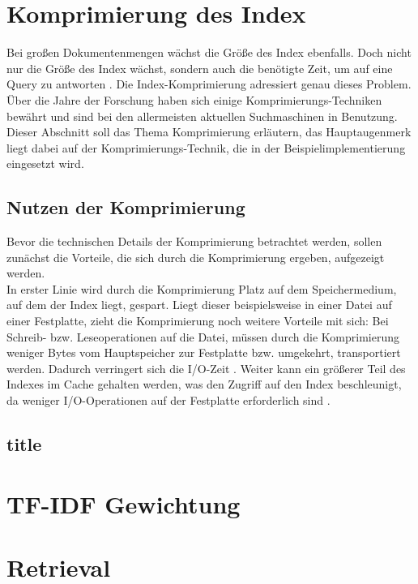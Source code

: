 \section{Komprimierung des Index}
Bei großen Dokumentenmengen wächst die Größe des Index ebenfalls. Doch nicht nur die Größe des Index wächst, sondern auch die benötigte Zeit, um auf eine Query zu antworten \cite{IR_Intro_Cambridge}.
Die Index-Komprimierung adressiert genau dieses Problem. Über die Jahre der Forschung haben sich einige Komprimierungs-Techniken bewährt und sind bei den allermeisten aktuellen Suchmaschinen in Benutzung. \newline
Dieser Abschnitt soll das Thema Komprimierung erläutern, das Hauptaugenmerk liegt dabei auf der Komprimierungs-Technik, die in der Beispielimplementierung eingesetzt wird.

\subsection{Nutzen der Komprimierung}
Bevor die technischen Details der Komprimierung betrachtet werden, sollen zunächst die Vorteile, die sich durch die Komprimierung ergeben, aufgezeigt werden.
\\
In erster Linie wird durch die Komprimierung Platz auf dem Speichermedium, auf dem der Index liegt, gespart. Liegt dieser beispielsweise in einer Datei auf einer Festplatte, zieht die Komprimierung noch weitere Vorteile mit sich: Bei Schreib- bzw. Leseoperationen auf die Datei, müssen durch die Komprimierung weniger Bytes vom Hauptspeicher zur Festplatte bzw. umgekehrt, transportiert werden. Dadurch verringert sich die I/O-Zeit \cite[S. 58, 86]{IR_Intro_Cambridge}. Weiter kann ein größerer Teil des Indexes im Cache gehalten werden, was den Zugriff auf den Index beschleunigt, da weniger I/O-Operationen auf der Festplatte erforderlich sind \cite[S. 58, 86]{IR_Intro_Cambridge}.

\subsection{title}

\section{TF-IDF Gewichtung}

\section{Retrieval}